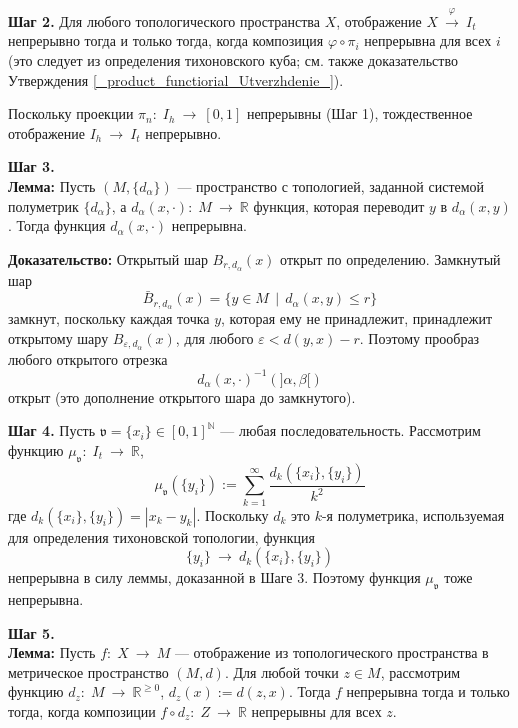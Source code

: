 \documentclass[12pt]{book}
\newcommand{\arrow}{{\:\longrightarrow\:}}
\renewcommand{\phi}{\varphi}
\renewcommand{\epsilon}{\varepsilon}
\def\R{{\mathbb R}}
\def\N{{\mathbb N}}
\theoremstyle{upshape}
\theoremstyle{generic}
\theoremstyle{upshapenonumber}
\newcommand{\следствие}{%
     \refstepcounter{teorema}
     {\noindent\bf Следствие \thechapter.\arabic{teorema}:\ }}
\newcommand{\пример}{%
     \refstepcounter{teorema}
     {\noindent\bf Пример \thechapter.\arabic{teorema}:\ }}
\newcommand{\лемма}{%
     \refstepcounter{teorema}
     {\noindent\bf Лемма \thechapter.\arabic{teorema}:\ }}
\newcommand{\теорема}{%
     \refstepcounter{teorema}
     {\noindent\bf Теорема \thechapter.\arabic{teorema}:\ }}
\newcommand{\утверждение}{%
     \refstepcounter{teorema}
     {\noindent\bf Утверждение \thechapter.\arabic{teorema}:\ }}
\def\хфилл{\hfill}
\def\ноиндент{\noindent}
\def\бф{\bf}
\def\goth{\mathfrak}
\begin{document}
\хфилл

\noindent
{\бф Шаг 2.} Для любого топологического пространства
$X$, отображение $X \stackrel \phi\arrow I_t$ 
непрерывно тогда и только тогда, когда композиция $\phi\circ \pi_i$
непрерывна для всех $i$
(это следует из определения тихоновского куба;
см. также доказательство 
Утверждения \ref{_product_functiorial_Utverzhdenie_}).

Поскольку проекции $\pi_n:\; I_h\arrow [0,1]$ 
непрерывны (Шаг 1), тождественное отображение 
$I_h \arrow I_t$
непрерывно.

\хфилл

\noindent
{\бф Шаг 3.} \\
{\bf Лемма:}
Пусть $(M, \{d_\alpha\})$ --- пространство с топологией,
заданной системой полуметрик $\{d_\alpha\}$,
а $d_\alpha(x, \cdot):\; M \arrow \R$
функция, которая переводит $y$ в $d_\alpha(x, y)$.
Тогда функция $d_\alpha(x, \cdot)$ непрерывна.

\хфилл

\noindent
{\бф Доказательство:} Открытый шар
$B_{r,d_\alpha}(x)$ открыт по определению.
Замкнутый шар 
\[
\bar B_{r,d_\alpha}(x)= \{ y \in M \ \ | \ \ d_\alpha(x, y) \leq r\}
\]
замкнут, поскольку каждая точка $y$, которая ему не принадлежит,
принадлежит открытому шару $B_{\epsilon,d_\alpha}(x)$,
для любого $\epsilon < d(y,x) -r$. 
Поэтому прообраз любого открытого отрезка
\[
  d_\alpha(x, \cdot)^{-1}(]\alpha, \beta[)
\]
открыт (это дополнение открытого шара до замкнутого).


\hfill

\noindent
{\бф Шаг 4.} 
Пусть ${\goth v}=\{x_i\}\in [0,1]^{\N}$ --- любая последовательность.
Рассмотрим функцию
$\mu_{\goth v}:\; I_t \arrow \R$,
\[
\mu_{\goth v}(\{y_i\}):= \sum_{k=1}^\infty \frac {d_k(\{x_i\}, \{y_i\})}{k^2}
\]
где $d_k(\{x_i\}, \{y_i\})= |x_k- y_k|$.
Поскольку $d_k$ это $k$-я полуметрика, используемая
для определения тихоновской топологии, 
 функция \[ \{y_i\}\arrow d_k(\{x_i\}, \{y_i\})\]
непрерывна в силу леммы, доказанной в Шаге 3.
Поэтому функция $\mu_{\goth v}$ тоже непрерывна.

\хфилл

\noindent
{\бф Шаг 5.}\\ 
\ноиндент
{\бф Лемма:}
Пусть $f:\; X \arrow M$ --- отображение из топологического
пространства в метрическое пространство $(M, d)$.
Для любой точки $z\in M$, рассмотрим функцию $d_z:\; M
\arrow \R^{\geq 0}$,
$d_z(x):= d(z,x)$. Тогда $f$ непрерывна тогда и только
тогда, когда композиции $f\circ d_z:\; Z \arrow \R$ непрерывны
для всех $z$.
\end{document}
